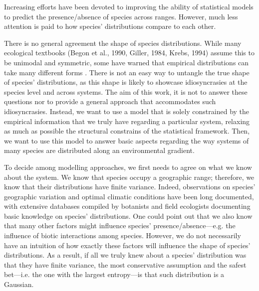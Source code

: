 \documentclass[11pt, a4paper]{article}
\begin{document}
Increasing efforts have been devoted to improving the ability of statistical models to predict the presence/absence of species across ranges. However, much less attention is paid to how species' distributions compare to each other. 

There is no general agreement the shape of species distributions. While many ecological textbooks (Begon et al., 1990, Giller, 1984, Krebs, 1994) assume this to be unimodal and symmetric, some have warned that empirical distributions can take many different forms \citep{austin2002spatial}. There is not an easy way to untangle the true shape of species' distributions, as this shape is likely to showcase idiosyncrasies at the species level and across systems. The aim of this work, it is not to answer these questions nor to provide a general approach that accommodates such idiosyncrasies. Instead, we want to use a model that is solely constrained by the empirical information that we truly have regarding a particular system, relaxing as much as possible the structural constrains of the statistical framework. Then, we want to use this model to answer basic aspects regarding the way systems of many species are distributed along an environmental gradient. 

To decide among modelling approaches, we first needs to agree on what we know about the system. We know that species occupy a geographic range; therefore, we know that their distributions have finite variance. Indeed, observations on species' geographic variation and optimal climatic conditions have been long documented, with extensive databases compiled by botanists and field ecologists documenting basic knowledge on species' distributions. One could point out that we also know that many other factors might influence species' presence/absence---e.g. the influence of biotic interactions among species. However, we do not necessarily have an intuition of how exactly these factors will influence the shape of species' distributions. As a result, if all we truly knew about a species' distribution was that they have finite variance, the most conservative assumption and the safest bet---i.e. the one with the largest entropy---is that such distribution is a Gaussian.

\end{document}

